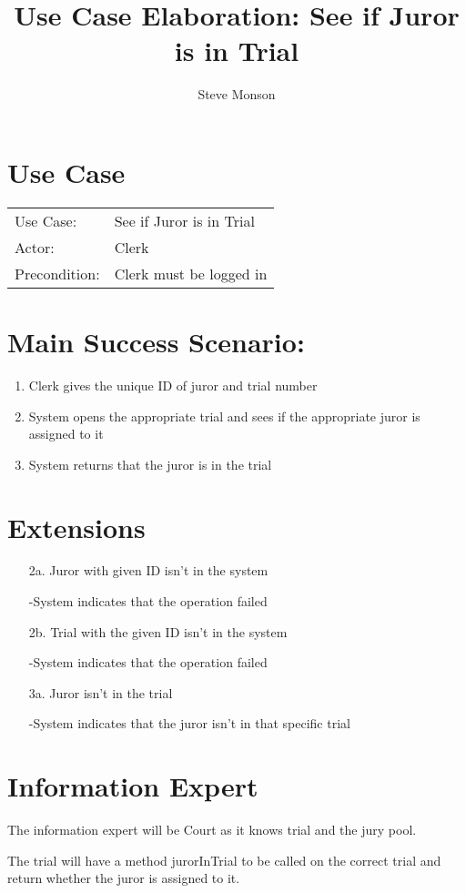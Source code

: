 \documentclass{article}
\title{Use Case Elaboration: See if Juror is in Trial}
\author{Steve Monson}
\begin{document}
\maketitle

\section*{Use Case}
\begin{tabular}{l l}
  Use Case:     & See if Juror is in Trial\\
  Actor:        & Clerk\\
  Precondition: & Clerk must be logged in\\
\end{tabular}

\section*{Main Success Scenario:}
\begin{enumerate}
  \item Clerk gives the unique ID of juror and trial number
  \item System opens the appropriate trial and sees if the appropriate juror is assigned to it
  \item System returns that the juror is in the trial
\end{enumerate}

\section*{Extensions}
\begin{itemize}
  \item [2a.] Juror with given ID isn't in the system
  
    -System indicates that the operation failed
  
  \item [2b.] Trial with the given ID isn't in the system

    -System indicates that the operation failed
    
  \item [3a.] Juror isn't in the trial
  
    -System indicates that the juror isn't in that specific trial
    
\end{itemize}

\section*{Information Expert}

The information expert will be Court as it knows trial and the jury pool.

The trial will have a method jurorInTrial to be called on the correct trial and return whether the juror is assigned to it.
\end{document}
